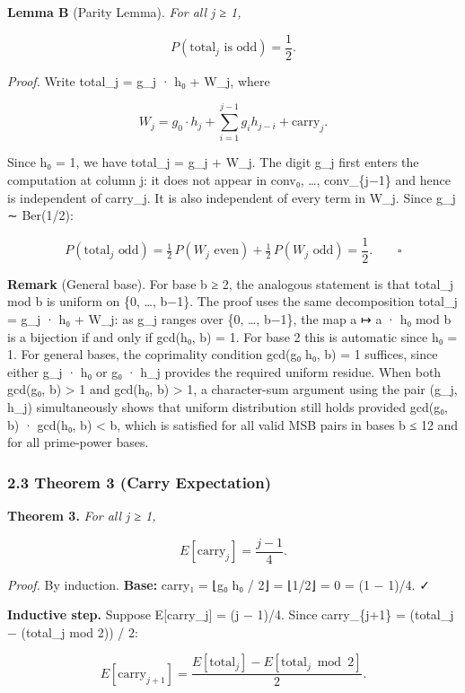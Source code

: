 \documentclass[
  11pt,
]{article}
\begin{document}
\textbf{Lemma B} (Parity Lemma). \emph{For all j ≥ 1,}

\[P(\text{total}_j \text{ is odd}) = \frac{1}{2}.\]

\emph{Proof.} Write total\_j = g\_j · h₀ + W\_j, where

\[W_j = g_0 \cdot h_j + \sum_{i=1}^{j-1} g_i h_{j-i} + \text{carry}_j.\]

Since h₀ = 1, we have total\_j = g\_j + W\_j. The digit g\_j first enters the
computation at column j: it does not appear in conv₀, \ldots, conv\_\{j−1\} and
hence is independent of carry\_j. It is also independent of every term in W\_j.
Since g\_j ∼ Ber(1/2):

\[P(\text{total}_j \text{ odd}) = \tfrac{1}{2}\,P(W_j \text{ even}) + \tfrac{1}{2}\,P(W_j \text{ odd}) = \frac{1}{2}. \qquad \square\]

\textbf{Remark} (General base). For base b ≥ 2, the analogous statement is that
total\_j mod b is uniform on \{0, \ldots, b−1\}. The proof uses the same
decomposition total\_j = g\_j · h₀ + W\_j: as g\_j ranges over \{0, \ldots,
b−1\}, the map a ↦ a · h₀ mod b is a bijection if and only if gcd(h₀, b) = 1.
For base 2 this is automatic since h₀ = 1. For general bases, the coprimality
condition gcd(g₀ h₀, b) = 1 suffices, since either g\_j · h₀ or g₀ · h\_j
provides the required uniform residue. When both gcd(g₀, b) \textgreater{} 1 and
gcd(h₀, b) \textgreater{} 1, a character-sum argument using the pair (g\_j,
h\_j) simultaneously shows that uniform distribution still holds provided
gcd(g₀, b) · gcd(h₀, b) \textless{} b, which is satisfied for all valid MSB
pairs in bases b ≤ 12 and for all prime-power bases.

\subsubsection{2.3 Theorem 3 (Carry
Expectation)}\label{theorem-3-carry-expectation}

\textbf{Theorem 3.} \emph{For all j ≥ 1,}

\[E[\text{carry}_j] = \frac{j-1}{4}.\]

\emph{Proof.} By induction. \textbf{Base:} carry₁ = ⌊g₀ h₀ / 2⌋ = ⌊1/2⌋ = 0 = (1
− 1)/4. ✓

\textbf{Inductive step.} Suppose E{[}carry\_j{]} = (j − 1)/4. Since
carry\_\{j+1\} = (total\_j − (total\_j mod 2)) / 2:

\[E[\text{carry}_{j+1}] = \frac{E[\text{total}_j] - E[\text{total}_j \bmod 2]}{2}.\]
\end{document}
